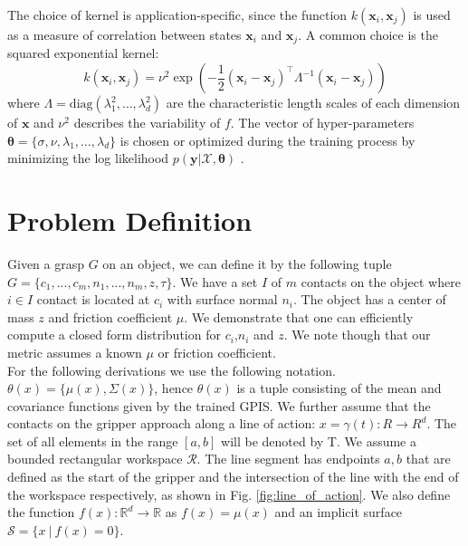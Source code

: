 \documentclass[letterpaper, 10 pt, conference]{ieeeconf}  %
\newcommand{\by}{\mathbf{y}}
\newcommand{\bx}{\mathbf{x}}
\newcommand{\mX}{\mathcal{X}}
\begin{document}
The choice of kernel is application-specific, since the function $k(\bx_i,\bx_j)$ is used as a measure of correlation between states $\bx_i$ and $\bx_j$.
A common choice is the squared exponential kernel:
\begin{equation}
k(\bx_i,\bx_j) 
=
\nu^2\exp(-\frac{1}{2}(\bx_i - \bx_j)^{\intercal}\Lambda^{-1}(\bx_i - \bx_j))
\end{equation}
where $\Lambda= \text{diag}(\lambda_1^2,\ldots,\lambda_d^2)$ are the characteristic length scales of each dimension of $\bx$ and $\nu^2$ describes the variability of $f$.
The vector of hyper-parameters $\boldsymbol{\theta} = \{\sigma,\nu,\lambda_1,\ldots,\lambda_d\}$ is chosen or optimized during the training process by minimizing the log likelihood $p(\by|\mX,\boldsymbol{\theta})$ \cite{rasmussen2006}.


\section{Problem Definition}
Given a grasp $G$ on an object, we can define it by the following tuple $G = \lbrace c_1,...,c_m,n_1,...,n_m,z,\tau\rbrace$. We have a set $I$ of $m$ contacts on the object where $i \in I$ contact is located at $c_i$ with surface normal $n_i$.
The object has a center of mass $z$ and friction coefficient $\mu$.
We demonstrate that one can efficiently compute a closed form distribution for $c_i$,$n_i$ and $z$.
We note though that our metric assumes a known $\mu$ or friction coefficient. \\


 For the following derivations we use the following notation.
 $\theta(x) = \lbrace \mu(x),\Sigma(x) \rbrace$, hence $\theta(x)$ is a tuple consisting of the mean and covariance functions given by the trained GPIS.
We further assume that the contacts on the gripper approach along a line of action: $x = \gamma(t): R \rightarrow R^d$. The set of all elements in the range $[a,b]$ will be denoted by T. 
We assume a bounded rectangular workspace $\mathcal{R}$.
The line segment has endpoints $a,b$ that are defined as the start of the gripper and the intersection of the line with the end of the workspace respectively, as shown in Fig.
 \ref{fig:line_of_action}.
 We also define the function $f(x): \mathbb{R}^d \rightarrow \mathbb{R}$ as $f(x) = \mu(x)$ and an implicit surface $\mathcal{S} = \{ x \ | \ f(x) = 0 \}$.
\end{document}
